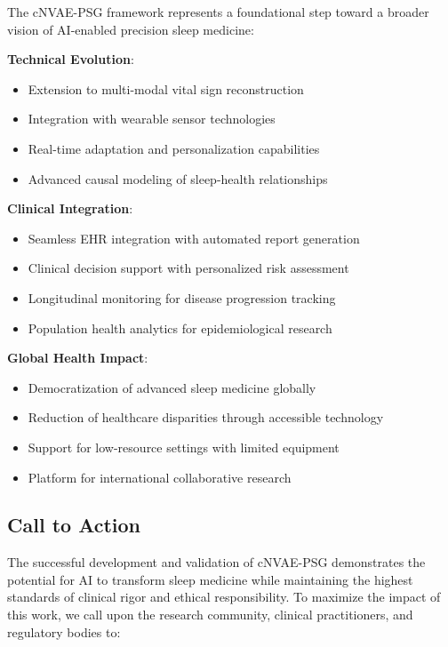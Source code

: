 \documentclass[11pt]{article}
\begin{document}
The cNVAE-PSG framework represents a foundational step toward a broader vision of AI-enabled precision sleep medicine:

\textbf{Technical Evolution}:
\begin{itemize}
    \item Extension to multi-modal vital sign reconstruction
    \item Integration with wearable sensor technologies
    \item Real-time adaptation and personalization capabilities
    \item Advanced causal modeling of sleep-health relationships
\end{itemize}

\textbf{Clinical Integration}:
\begin{itemize}
    \item Seamless EHR integration with automated report generation
    \item Clinical decision support with personalized risk assessment
    \item Longitudinal monitoring for disease progression tracking
    \item Population health analytics for epidemiological research
\end{itemize}

\textbf{Global Health Impact}:
\begin{itemize}
    \item Democratization of advanced sleep medicine globally
    \item Reduction of healthcare disparities through accessible technology
    \item Support for low-resource settings with limited equipment
    \item Platform for international collaborative research
\end{itemize}

\subsection{Call to Action}

The successful development and validation of cNVAE-PSG demonstrates the potential for AI to transform sleep medicine while maintaining the highest standards of clinical rigor and ethical responsibility. To maximize the impact of this work, we call upon the research community, clinical practitioners, and regulatory bodies to:
\end{document}

